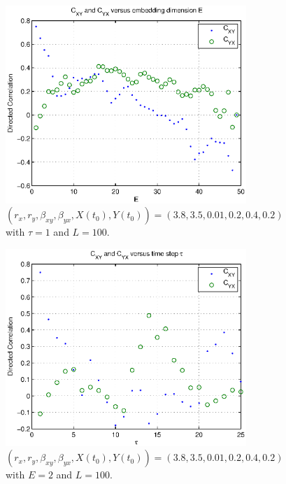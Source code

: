 \documentclass[a4paper,11pt]{article}
\begin{document}
\begin{figure}[h!t]
\centering
\begin{subfigure}[b]{0.4\textwidth}
\label{fig:CxyCyxVE}
\includegraphics[scale=0.55]{CxyCyxVE.eps}
\caption{$\left(r_x,r_y,\beta_{xy},\beta_{yx},X(t_0),Y(t_0)\right) = \left(3.8,3.5,0.01,0.2,0.4,0.2\right)$ with $\tau=1$ and $L=100$.}
\end{subfigure}
\begin{subfigure}[b]{0.4\textwidth}
\label{fig:CxyCyxVtau}
\includegraphics[scale=0.55]{CxyCyxVtau.eps}
\caption{$\left(r_x,r_y,\beta_{xy},\beta_{yx},X(t_0),Y(t_0)\right) = \left(3.8,3.5,0.01,0.2,0.4,0.2\right)$ with $E=2$ and $L=100$.}
\end{subfigure}
\caption{}
\end{figure}
\end{document}
